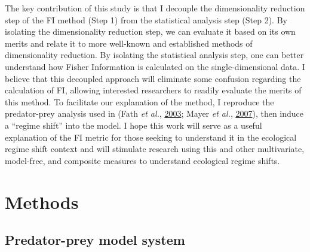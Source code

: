 \documentclass[print]{nuthesis}
\begin{document}
The key contribution of this study is that I decouple the dimensionality reduction step of the FI method (Step 1) from the statistical analysis step (Step 2). By isolating the dimensionality reduction step, we can evaluate it based on its own merits and relate it to more well-known and established methods of dimensionality reduction. By isolating the statistical analysis step, one can better understand how Fisher Information is calculated on the single-dimensional data. I believe that this decoupled approach will eliminate some confusion regarding the calculation of FI, allowing interested researchers to readily evaluate the merits of this method. To facilitate our explanation of the method, I reproduce the predator-prey analysis used in (Fath \emph{et al.}, \protect\hyperlink{ref-fath_regime_2003}{2003}; Mayer \emph{et al.}, \protect\hyperlink{ref-mayer_applications_2007}{2007}), then induce a ``regime shift'' into the model. I hope this work will serve as a useful explanation of the FI metric for those seeking to understand it in the ecological regime shift context and will stimulate research using this and other multivariate, model-free, and composite measures to understand ecological regime shifts.

\hypertarget{methods-1}{%
\section{Methods}\label{methods-1}}

\hypertarget{predator-prey-model-system}{%
\subsection{Predator-prey model system}\label{predator-prey-model-system}}
\end{document}
